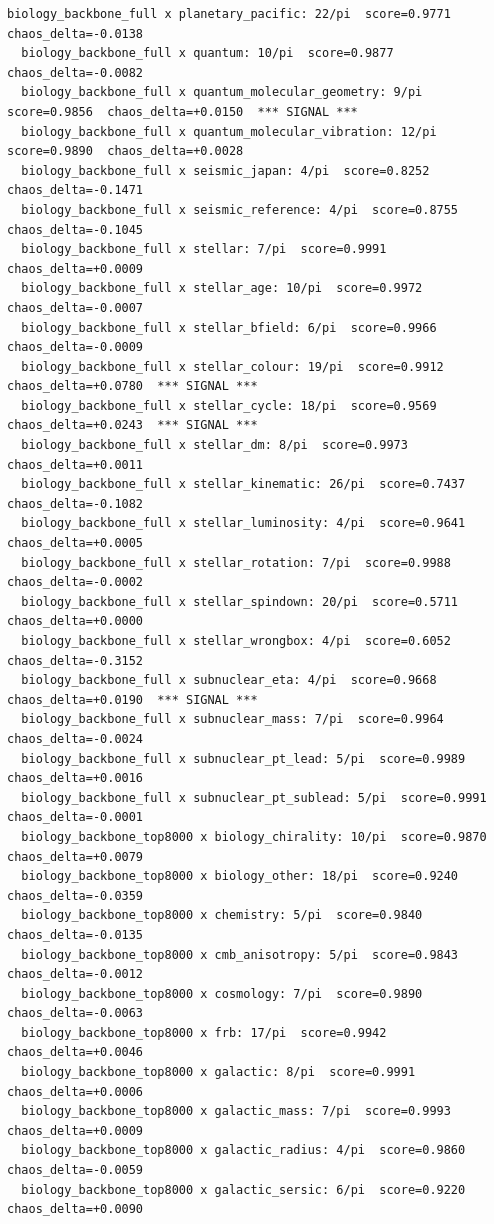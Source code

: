 \documentclass[11pt, letterpaper, openany]{book}
\begin{document}
\begin{empiricalbox}
\begin{lstlisting}[style=terminal]
  biology_backbone_full x planetary_pacific: 22/pi  score=0.9771  chaos_delta=-0.0138
  biology_backbone_full x quantum: 10/pi  score=0.9877  chaos_delta=-0.0082
  biology_backbone_full x quantum_molecular_geometry: 9/pi  score=0.9856  chaos_delta=+0.0150  *** SIGNAL ***
  biology_backbone_full x quantum_molecular_vibration: 12/pi  score=0.9890  chaos_delta=+0.0028
  biology_backbone_full x seismic_japan: 4/pi  score=0.8252  chaos_delta=-0.1471
  biology_backbone_full x seismic_reference: 4/pi  score=0.8755  chaos_delta=-0.1045
  biology_backbone_full x stellar: 7/pi  score=0.9991  chaos_delta=+0.0009
  biology_backbone_full x stellar_age: 10/pi  score=0.9972  chaos_delta=-0.0007
  biology_backbone_full x stellar_bfield: 6/pi  score=0.9966  chaos_delta=-0.0009
  biology_backbone_full x stellar_colour: 19/pi  score=0.9912  chaos_delta=+0.0780  *** SIGNAL ***
  biology_backbone_full x stellar_cycle: 18/pi  score=0.9569  chaos_delta=+0.0243  *** SIGNAL ***
  biology_backbone_full x stellar_dm: 8/pi  score=0.9973  chaos_delta=+0.0011
  biology_backbone_full x stellar_kinematic: 26/pi  score=0.7437  chaos_delta=-0.1082
  biology_backbone_full x stellar_luminosity: 4/pi  score=0.9641  chaos_delta=+0.0005
  biology_backbone_full x stellar_rotation: 7/pi  score=0.9988  chaos_delta=-0.0002
  biology_backbone_full x stellar_spindown: 20/pi  score=0.5711  chaos_delta=+0.0000
  biology_backbone_full x stellar_wrongbox: 4/pi  score=0.6052  chaos_delta=-0.3152
  biology_backbone_full x subnuclear_eta: 4/pi  score=0.9668  chaos_delta=+0.0190  *** SIGNAL ***
  biology_backbone_full x subnuclear_mass: 7/pi  score=0.9964  chaos_delta=-0.0024
  biology_backbone_full x subnuclear_pt_lead: 5/pi  score=0.9989  chaos_delta=+0.0016
  biology_backbone_full x subnuclear_pt_sublead: 5/pi  score=0.9991  chaos_delta=-0.0001
  biology_backbone_top8000 x biology_chirality: 10/pi  score=0.9870  chaos_delta=+0.0079
  biology_backbone_top8000 x biology_other: 18/pi  score=0.9240  chaos_delta=-0.0359
  biology_backbone_top8000 x chemistry: 5/pi  score=0.9840  chaos_delta=-0.0135
  biology_backbone_top8000 x cmb_anisotropy: 5/pi  score=0.9843  chaos_delta=-0.0012
  biology_backbone_top8000 x cosmology: 7/pi  score=0.9890  chaos_delta=-0.0063
  biology_backbone_top8000 x frb: 17/pi  score=0.9942  chaos_delta=+0.0046
  biology_backbone_top8000 x galactic: 8/pi  score=0.9991  chaos_delta=+0.0006
  biology_backbone_top8000 x galactic_mass: 7/pi  score=0.9993  chaos_delta=+0.0009
  biology_backbone_top8000 x galactic_radius: 4/pi  score=0.9860  chaos_delta=-0.0059
  biology_backbone_top8000 x galactic_sersic: 6/pi  score=0.9220  chaos_delta=+0.0090

\end{lstlisting}
\end{empiricalbox}
\end{document}
